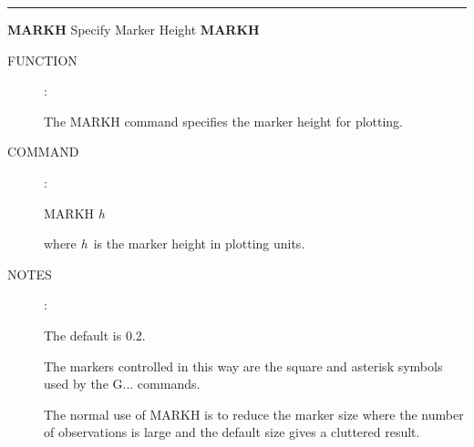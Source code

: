 
\goodbreak
\rule{\textwidth}{0.3mm}
{\Large {\bf MARKH} \hfill Specify Marker Height \hfill {\bf MARKH}}
\begin{description}
\item [FUNCTION]:

The MARKH command specifies the marker height for plotting.

\item [COMMAND]:

\begin{cmd}
\> \> MARKH {\it h}
\end{cmd}

where {\it h}\, is the marker height in plotting units.

\item [NOTES]:

The default is 0.2.

The markers controlled in this way are the square and asterisk
symbols used by the G... commands.

The normal use of MARKH is to reduce the marker size
where the number of observations is large and the default
size gives a cluttered result.

\end{description}


